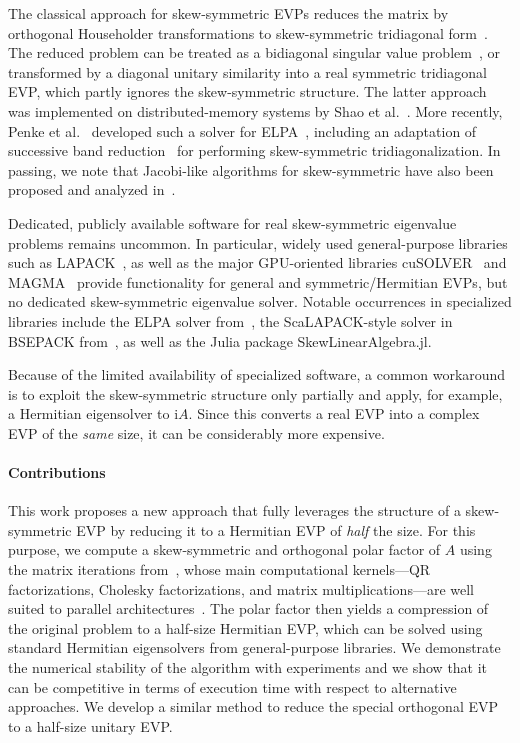 \documentclass[final,onefignum,onetabnum,dvipsnames]{siamart251216}
\numberwithin{algorithm}{section}
\numberwithin{equation}{section}
\newcommand{\new}[1]{#1}
\begin{document}
The classical approach for skew-symmetric EVPs reduces the matrix by
orthogonal Householder transformations to skew-symmetric tridiagonal
form~\cite{Wilkinson62,MR501120}. The reduced problem can be treated
as a bidiagonal singular value problem~\cite{WardGray78}, or transformed
by a diagonal unitary similarity into a real symmetric tridiagonal
EVP, which partly ignores the skew-symmetric structure. The latter approach was implemented on distributed-memory systems
by Shao et al.~\cite{MR3419779}. More recently, Penke
et al.~\cite{Penke20} developed such a solver for ELPA~\cite{ELPA}, including
an adaptation of successive band reduction~\cite{MR1941085}
for performing skew-symmetric tridiagonalization. In passing, we note that 
Jacobi-like algorithms for skew-symmetric have also been proposed and analyzed in~\cite{MR1227767,Paardekooper1971}.

Dedicated, publicly available software for real skew-symmetric eigenvalue problems remains uncommon. In particular, widely used general-purpose libraries such as LAPACK~\cite{lapack99}, as well as the major GPU-oriented libraries cuSOLVER~\cite{NVIDIAcuSOLVER} and MAGMA~\cite{Tomov2010MAGMA} provide functionality for general and symmetric/Hermitian EVPs, but no dedicated skew-symmetric eigenvalue solver. Notable occurrences in specialized libraries include the ELPA solver from~\cite{Penke20}, the ScaLAPACK-style solver in BSEPACK from~\cite{MR3419779}, as well as the Julia package SkewLinearAlgebra.jl. 

Because of the limited availability of specialized software, a common workaround is to exploit the skew-symmetric structure only partially and apply, for example, a Hermitian eigensolver to $\mathrm{i} A$. Since this converts a real EVP into a complex EVP of the \emph{same} size, it can be considerably more expensive.

\paragraph{Contributions}
This work proposes a new approach that fully leverages the structure of a skew-symmetric EVP by reducing it to a Hermitian EVP of \emph{half} the size. For this purpose, we compute a skew-symmetric and orthogonal polar factor of $A$ using the matrix iterations from~\cite{NakatsukasaBaiGygi2010,NakatsukasaHigham2012}, whose main
computational kernels---QR factorizations, Cholesky factorizations, and matrix multiplications---are well suited to parallel architectures~\cite{Ltaief19}. The polar factor then yields a compression of the original problem to a half-size Hermitian EVP, which can be solved using standard Hermitian eigensolvers from general-purpose libraries. We demonstrate the numerical stability of the algorithm with experiments and we show that it can be competitive in terms of execution time with respect to alternative approaches. \new{We develop a similar method to reduce the special orthogonal EVP to a half-size unitary EVP.}
\end{document}
